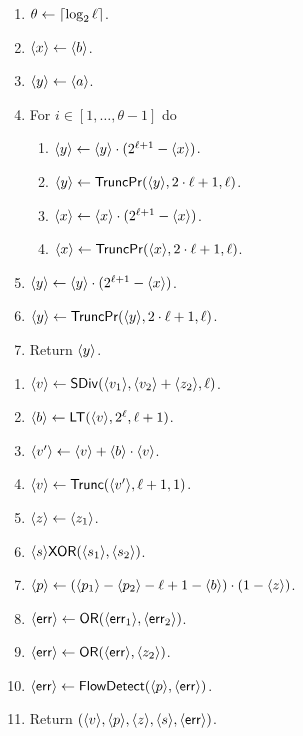 \begin{enumerate}
\item $\theta \leftarrow {\lceil \log_{2} \ell \rceil}$. 
\item $\langle x \rangle \leftarrow \langle b \rangle$.
\item $\langle y \rangle \leftarrow \langle a \rangle$.
\item For $i \in [1,\ldots,\theta-1]$ do
\begin{enumerate}
  \item $\langle y \rangle \leftarrow \langle y \rangle \cdot (2^{\ell+1}-\langle x \rangle)$.
  \item $\langle y \rangle \leftarrow \mathsf{TruncPr}(\langle y \rangle,2\cdot \ell+1,\ell)$.
  \item $\langle x \rangle \leftarrow \langle x \rangle \cdot (2^{\ell+1}-\langle x \rangle)$.
  \item $\langle x \rangle \leftarrow \mathsf{TruncPr}(\langle x \rangle,2\cdot \ell+1,\ell)$.
\end{enumerate}
\item $\langle y \rangle \leftarrow \langle y \rangle \cdot (2^{\ell+1}-\langle x \rangle)$.
\item $\langle y \rangle \leftarrow \mathsf{TruncPr}(\langle y \rangle,2\cdot \ell+1,\ell)$.
\item Return $\langle y \rangle$.
\end{enumerate}

\begin{enumerate}
\item $\langle v \rangle \leftarrow \mathsf{SDiv}(\langle v_1 \rangle,\langle v_2 \rangle+\langle z_2 \rangle,\ell)$.
\item $\langle b \rangle \leftarrow \mathsf{LT}(\langle v \rangle,2^\ell,\ell+1)$.
\item $\langle v' \rangle \leftarrow \langle v \rangle+\langle b \rangle \cdot \langle v \rangle$.
\item $\langle v \rangle \leftarrow \mathsf{Trunc}(\langle v' \rangle, \ell+1, 1)$.
\item $\langle z \rangle \leftarrow \langle z_1 \rangle$.
\item $\langle s \rangle \mathsf{XOR}(\langle s_1 \rangle,\langle s_2 \rangle)$.
\item $\langle p \rangle \leftarrow (\langle p_1 \rangle-\langle p_2 \rangle-\ell+1-\langle b \rangle) \cdot (1-\langle z \rangle)$.
\item $\langle \mathsf{err} \rangle \leftarrow \mathsf{OR}(\langle \mathsf{err}_1 \rangle,\langle \mathsf{err}_2 \rangle)$.
\item $\langle \mathsf{err} \rangle \leftarrow \mathsf{OR}(\langle \mathsf{err} \rangle,\langle z_2 \rangle)$.
\item $\langle \mathsf{err} \rangle \leftarrow \mathsf{FlowDetect}(\langle p \rangle,\langle \mathsf{err} \rangle)$.
\item Return $(\langle v \rangle,\langle p \rangle,\langle z \rangle,\langle s \rangle,\langle \mathsf{err} \rangle)$.
\end{enumerate}


